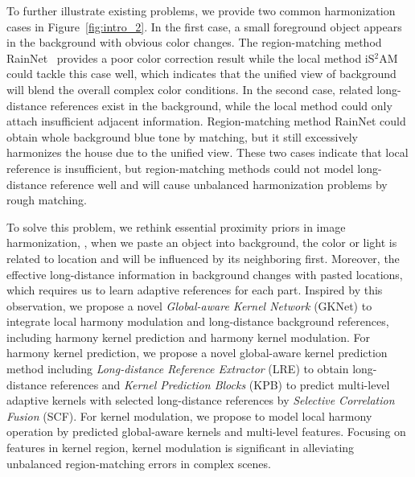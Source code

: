 \documentclass[10pt,twocolumn,letterpaper]{article}
\begin{document}
To further illustrate existing problems, we provide two common harmonization cases in Figure~\ref{fig:intro_2}. In the first case, a small foreground object appears in the background with obvious color changes. The region-matching method RainNet~\cite{Cong_2020_CVPR} provides a poor color correction result while the local method iS$^2$AM~\cite{Sofiiuk_2021_WACV} could tackle this case well, which indicates that the unified view of background will blend the overall complex color conditions. In the second case, related long-distance references exist in the background, while the local method could only attach insufficient adjacent information. Region-matching method RainNet could obtain whole background blue tone by matching, but it still excessively harmonizes the house due to the unified view. These two cases indicate that local reference is insufficient, but region-matching methods could not model long-distance reference well and will cause unbalanced harmonization problems by rough matching. 

To solve this problem, we rethink essential proximity priors in image harmonization, \ie, when we paste an object into background, the color or light is related to location and will be influenced by its neighboring first. Moreover, the effective long-distance information in background changes with pasted locations, which requires us to learn adaptive references for each part. Inspired by this observation, we propose a novel \emph{Global-aware Kernel Network} (GKNet) to integrate local harmony modulation and long-distance background references, including harmony kernel prediction and harmony kernel modulation. For harmony kernel prediction, we propose a novel global-aware kernel prediction method including \emph{Long-distance Reference Extractor} (LRE) to obtain long-distance references and \emph{Kernel Prediction Blocks} (KPB) to predict multi-level adaptive kernels with selected long-distance references by \emph{Selective Correlation Fusion} (SCF). For kernel modulation, we propose to model local harmony operation by predicted global-aware kernels and multi-level features. Focusing on features in kernel region, kernel modulation is significant in alleviating unbalanced region-matching errors in complex scenes.
\end{document}
